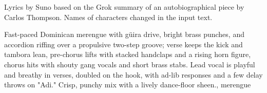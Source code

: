 

\begin{notes}
Lyrics by Suno based on the Grok summary of an autobiographical piece by Carlos Thompson. %
Names of characters changed in the input text.
\end{notes}

\begin{style}
Fast-paced Dominican merengue with güira drive, bright brass punches, and accordion riffing over a propulsive two-step groove; verse keeps the kick and tambora lean, pre-chorus lifts with stacked handclaps and a rising horn figure, chorus hits with shouty gang vocals and short brass stabs. %
Lead vocal is playful and breathy in verses, doubled on the hook, with ad-lib responses and a few delay throws on "Adi." Crisp, punchy mix with a lively dance-floor sheen., merengue
\end{style}

